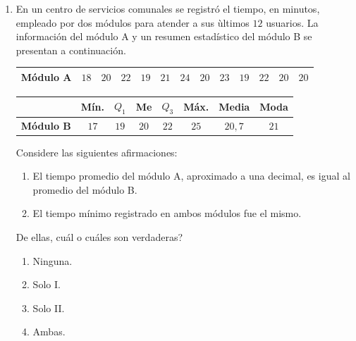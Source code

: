 \documentclass[12pt]{article}
\newcommand{\opcion}[2]{\item $#2$}
\begin{document}
\begin{enumerate}[label=\textbf{\arabic*.}, start=29, itemsep=1cm]
Seg\'un los datos, \textquestiondown cu\'antos minutos, aproximadamente, permaneci\'o en promedio una persona en la biblioteca?

\begin{enumerate}[label=\Alph*)]
  \opcion{A}{25{,}0}
  \opcion{B}{28{,}3}
  \opcion{C}{30{,}0}
  \opcion{D}{31{,}7}
\end{enumerate}

\Needspace{0.78\textheight}
\item
En un centro de servicios comunales se registr\'o el tiempo, en minutos, empleado por dos m\'odulos para atender a sus \`ultimos $12$ usuarios. La informaci\'on del m\'odulo A y un resumen estad\'istico del m\'odulo B se presentan a continuaci\'on.

\begin{center}
\begingroup
\small
\renewcommand{\arraystretch}{1.35}
\begin{tabular}{|c|*{12}{c|}}
\hline
\textbf{M\'odulo A} & $18$ & $20$ & $22$ & $19$ & $21$ & $24$ & $20$ & $23$ & $19$ & $22$ & $20$ & $20$ \\ \hline
\end{tabular}

\vspace{0.45cm}

\begin{tabular}{|c|c|c|c|c|c|c|c|}
\hline
 & \textbf{M\'in.} & $Q_1$ & \textbf{Me} & $Q_3$ & \textbf{M\'ax.} & \textbf{Media} & \textbf{Moda} \\ \hline
\textbf{M\'odulo B} & $17$ & $19$ & $20$ & $22$ & $25$ & $20{,}7$ & $21$ \\ \hline
\end{tabular}
\endgroup
\end{center}

Considere las siguientes afirmaciones:

\begin{enumerate}[label=\Roman*.]
  \item El tiempo promedio del m\'odulo A, aproximado a una decimal, es igual al promedio del m\'odulo B.
  \item El tiempo m\'inimo registrado en ambos m\'odulos fue el mismo.
\end{enumerate}

De ellas, \textquestiondown cu\'al o cu\'ales son verdaderas?

\begin{enumerate}[label=\Alph*)]
  \item Ninguna.
  \item Solo I.
  \item Solo II.
  \item Ambas.
\end{enumerate}


\end{enumerate}
\end{document}
